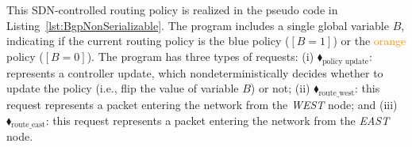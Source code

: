 %
This SDN-controlled routing policy is realized in the pseudo code in Listing~\ref{lst:BgpNonSerializable}.
%
The program includes a single global variable $B$, indicating if the current routing policy is the  \textcolor{NavyBlue}{blue} policy ($[B=1]$) or the \textcolor{darkorange}{orange} policy ($[B=0]$).
%
The program has three types of requests:
%	
	(i)
	{\color{ForestGreen}$\blacklozenge_\text{policy update}$}:
 represents a controller  update, which nondeterministically decides whether to update the policy (i.e., flip the value of  variable $B$) or not;
%	
(ii)
	{\color{ForestGreen}$\blacklozenge_\text{route\_west}$}:
	 this request represents a packet entering the network from the \textit{WEST} node; and 
%	
(iii)
{\color{ForestGreen}$\blacklozenge_\text{route\_east}$}: this request represents a packet entering the network from the \textit{EAST} node.
%



